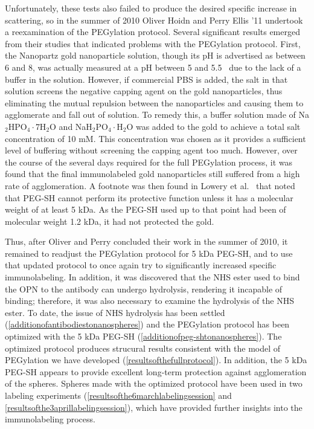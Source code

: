Unfortunately, these tests also failed to produce the desired specific increase in scattering, so in the summer of 2010 Oliver Hoidn and Perry Ellis '11 undertook a reexamination of the PEGylation protocol. Several significant results emerged from their studies that indicated problems with the PEGylation protocol. First, the Nanopartz gold nanoparticle solution, though its pH is advertised as between 6 and 8, was actually measured at a pH between 5 and 5.5~\citep{hoidnellis} due to the lack of a buffer in the solution. However, if commercial PBS is added, the salt in that solution screens the negative capping agent on the gold nanoparticles, thus eliminating the mutual repulsion between the nanoparticles and causing them to agglomerate and fall out of solution. To remedy this, a buffer solution made of Na$_2$HPO$_4\cdot$7H$_2$O and NaH$_2$PO$_4\cdot$H$_2$O was added to the gold to achieve a total salt concentration of 10 mM. This concentration was chosen as it provides a sufficient level of buffering without screening the capping agent too much. However, over the course of the several days required for the full PEGylation process, it was found that the final immunolabeled gold nanoparticles still suffered from a high rate of agglomeration. A footnote was then found in Lowery et al.~\citep{westpegylation} that noted that PEG-SH cannot perform its protective function unless it has a molecular weight of at least 5 kDa. As the PEG-SH used up to that point had been of molecular weight 1.2 kDa, it had not protected the gold.

Thus, after Oliver and Perry concluded their work in the summer of 2010, it remained to readjust the PEGylation protocol for 5 kDa PEG-SH, and to use that updated protocol to once again try to significantly increased specific immunolabeling. In addition, it was discovered that the NHS ester used to bind the OPN to the antibody can undergo hydrolysis, rendering it incapable of binding; therefore, it was also necessary to examine the hydrolysis of the NHS ester. To date, the issue of NHS hydrolysis has been settled (\autoref{additionofantibodiestonanospheres}) and the PEGylation protocol has been optimized with the 5 kDa PEG-SH (\autoref{additionofpeg-shtonanospheres}). The optimized protocol produces strucural results consistent with the model of PEGylation we have developed (\autoref{resultsofthefullprotocol}). In addition, the 5 kDa PEG-SH appears to provide excellent long-term protection against agglomeration of the spheres. Spheres made with the optimized protocol have been used in two labeling experiments (\autoref{resultsofthe6marchlabelingsession} and \autoref{resultsofthe3aprillabelingsession}), which have provided further insights into the immunolabeling process.
